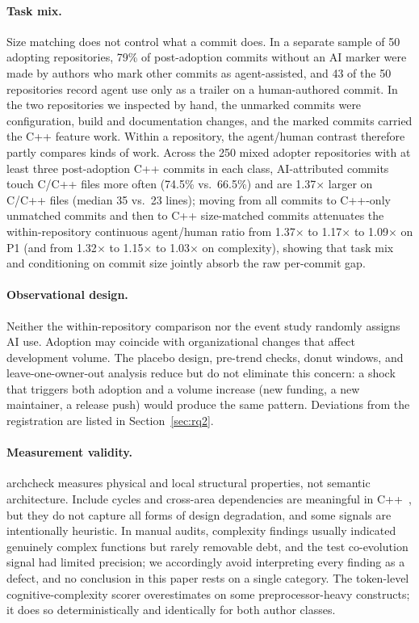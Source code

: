 \documentclass[sigplan,11pt,nonacm=true]{acmart}
\newcommand{\tool}{archcheck}
\newcommand{\x}{$\times$}
\begin{document}
\paragraph{Task mix.} Size matching does not control what a commit does. In a
separate sample of 50 adopting repositories, 79\% of post-adoption commits
without an AI marker were made by authors who mark other commits as
agent-assisted, and 43 of the 50 repositories record agent use only as a
trailer on a human-authored commit. In the two repositories we inspected by
hand, the unmarked commits were configuration, build and documentation
changes, and the marked commits carried the C++ feature work. Within a repository, the
agent/human contrast therefore partly compares kinds of work. Across the 250
mixed adopter repositories with at least three post-adoption C++ commits in
each class, AI-attributed commits touch C/C++ files more often (74.5\% vs.\
66.5\%) and are 1.37\x{} larger on C/C++ files (median 35 vs.\ 23 lines);
moving from all commits to C++-only unmatched commits and then to C++
size-matched commits attenuates the within-repository continuous agent/human
ratio from 1.37\x{} to 1.17\x{} to 1.09\x{} on P1 (and from 1.32\x{} to
1.15\x{} to 1.03\x{} on complexity), showing that task mix and conditioning on
commit size jointly absorb the raw per-commit gap.

\paragraph{Observational design.} Neither the within-re\-pos\-i\-tory comparison nor
the event study randomly assigns AI use. Adoption may coincide with
organizational changes that affect development volume. The placebo design,
pre-trend checks, donut windows, and leave-one-owner-out analysis reduce but
do not eliminate this concern: a shock that triggers both adoption and a
volume increase (new funding, a new maintainer, a release push) would produce
the same pattern. Deviations from the registration are listed in
Section~\ref{sec:rq2}.

\paragraph{Measurement validity.} \tool{} measures physical and local
structural properties, not semantic architecture. Include cycles and
cross-area dependencies are meaningful in C++~\cite{lakos1996,
coreguidelines}, but they do not capture all forms of design degradation, and
some signals are intentionally heuristic. In manual audits, complexity
findings usually indicated genuinely complex functions but rarely removable
debt, and the test co-evolution signal had limited precision; we accordingly
avoid interpreting every finding as a defect, and no conclusion in this paper
rests on a single category. The token-level cognitive-complexity scorer
overestimates on some preprocessor-heavy constructs; it does so
deterministically and identically for both author classes.
\end{document}
